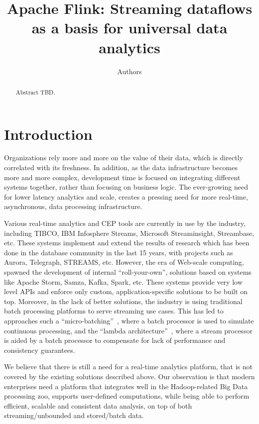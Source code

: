 \documentclass[11pt]{article}
\begin{document}
\title{Apache Flink\texttrademark : Streaming dataflows as a basis for universal data analytics}
\author{Authors}

\maketitle

\begin{abstract}
Abstract TBD.
\end{abstract}


\section{Introduction}

Organizations rely more and more on the value of their data, which is directly correlated with its freshness. In addition, as the data infrastructure becomes more and more complex, development time is focused on integrating different systems together, rather than focusing on business logic. The ever-growing need for lower latency analytics and scale, creates a pressing need for more real-time, asynchronous, data processing infrastructure.

Various real-time analytics and CEP tools are currently in use by the industry, including TIBCO, IBM Infosphere Streams, Microsoft Streaminsight, Streambase, etc. These systems implement and extend the results of research which has been done in the database community in the last 15 years, with projects such as Aurora, Telegraph, STREAMS, etc. However, the era of Web-scale computing, spawned the development of internal ``roll-your-own'', solutions based on systems like Apache Storm, Samza, Kafka, Spark, etc. These systems provide very low level APIs and enforce only custom, application-specific solutions to be built on top.  Moreover, in the lack of better solutions, the industry is using traditional batch processing platforms to serve streaming use cases. This has led to approaches such a ``micro-batching''~\cite{Zaharia:2013:DSF:2517349.2522737}, where a batch processor is used to simulate continuous processing, and the ``lambda architecture''~\cite{marz2015big}, where a stream processor is aided by a batch processor to compensate for lack of performance and consistency guarantees.

We believe that there is still a need for a real-time analytics platform, that is not covered by the existing solutions described above. Our observation is that modern enterprises need a platform that integrates well in the Hadoop-related Big Data processing zoo, supports user-defined computations, while being able to perform efficient, scalable and consistent data analysis, on top of both streaming/unbounded and stored/batch data.
\end{document}
